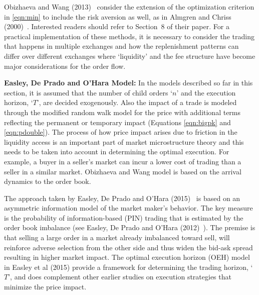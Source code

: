 Obizhaeva and Wang (2013)~\cite{obizhaeva} consider the extension of the optimization criterion in \eqref{eqn:min} to include the risk aversion as well, as in Almgren and Chriss (2000)~\cite{alm2000}. Interested readers should refer to Section~8 of their paper. For a practical implementation of these methods, it is necessary to consider the trading that happens in multiple exchanges and how the replenishment patterns can differ over different exchanges where `liquidity' and the fee structure have become major considerations for the order flow. \twomedskip


\noindent\textbf{Easley, De Prado and O'Hara Model:} In the models described so far in this section, it is assumed that the number of child orders `$n$' and the execution horizon, `$T$', are decided exogenously. Also the impact of a trade is modeled through the modified random walk model for the price with additional terms reflecting the permanent or temporary impact (Equations \ref{eqn:bigpk} and \ref{eqn:pdouble}). The process of how price impact arises due to friction in the liquidity access is an important part of market microstructure theory and this needs to be taken into account in determining the optimal execution. For example, a buyer in a seller's market can incur a lower cost of trading than a seller in a similar market. Obizhaeva and Wang model is based on the arrival dynamics to the order book. 


The approach taken by Easley, De Prado and O'Hara (2015)~\cite{prado2} is based on an asymmetric information model of the market maker's behavior. The key measure is the probability of information-based (PIN) trading that is estimated by the order book imbalance (see Easley, De Prado and O'Hara (2012)~\cite{prado3}). The premise is that selling a large order in a market already imbalanced toward sell, will reinforce adverse selection from the other side and thus widen the bid-ask spread resulting in higher market impact. The optimal execution horizon (OEH) model in Easley et al (2015) provide a framework for determining the trading horizon, `$T$', and does complement other earlier studies on execution strategies that minimize the price impact. 


